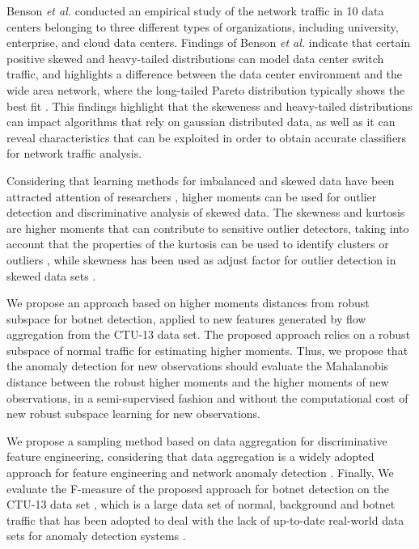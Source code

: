 \documentclass[review]{elsarticle}
\begin{document}
Benson \emph{et al.} \cite{benson2010network} conducted an empirical study of the network traffic in 10 data centers belonging to three different types of organizations, including university, enterprise, and cloud data centers. Findings of Benson \emph{et al.} indicate that certain positive skewed and heavy-tailed distributions can model data center switch traffic, and highlights a difference between the data center environment and the wide area network, where the long-tailed Pareto distribution typically shows the best fit \cite{benson2010network}. This findings highlight that the skeweness and heavy-tailed distributions can impact algorithms that rely on gaussian distributed data, as well as it can reveal characteristics that can be exploited in order to obtain accurate classifiers for network traffic analysis. 

Considering that learning methods for imbalanced and skewed data have been attracted attention of researchers \cite{Phua2004minority,hubert2009robustskewed}, higher moments can be used for outlier detection and discriminative analysis of skewed data. The skewness and kurtosis are higher moments that can contribute to sensitive outlier detectors, taking into account that the properties of the kurtosis can be used to identify clusters or outliers \cite{pena2010eigenvectors}, while skewness has been used as adjust factor for outlier detection in skewed data sets \cite{hubert2009robustskewed}.

We propose an approach based on higher moments distances from robust subspace for botnet detection, applied to new features generated by flow aggregation from the CTU-13 data set. The proposed approach relies on a robust subspace of normal traffic for estimating higher moments. Thus, we propose that the anomaly detection for new observations should evaluate the Mahalanobis distance between the robust higher moments and the higher moments of new observations, in a semi-supervised fashion and without the computational cost of new robust subspace learning for new observations. 

We propose a sampling method based on data aggregation for discriminative feature engineering, considering that data aggregation is a widely adopted approach for feature engineering \cite{garcia2014empirical, chandrashekar2014survey,acarali2016survey} and network anomaly detection \cite{lakhina2005mining, callegari2011novel, vieira2017model}. Finally, We evaluate the F-measure of the proposed approach for botnet detection on the CTU-13 data set \cite{garcia2014empirical}, which is a large data set of normal, background and botnet traffic that has been adopted to deal with the lack of up-to-date real-world data sets for anomaly detection systems \cite{osanaiye2016distributed}. 
\end{document}
